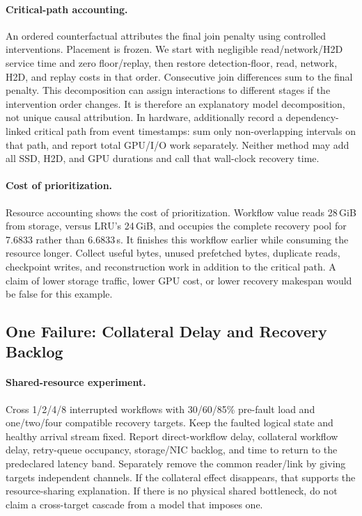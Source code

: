 \documentclass[sigplan,10pt,anonymous,nonacm]{acmart}
\begin{document}
\paragraph{Critical-path accounting.}
An ordered counterfactual attributes the final join penalty using controlled interventions. Placement is frozen. We start with negligible
read/network/H2D service time and zero floor/replay, then restore detection-floor, read, network, H2D, and replay costs in that order. Consecutive join differences sum to the final
penalty. This decomposition can assign interactions to different stages
if the intervention order changes. It is therefore an explanatory model
decomposition, not unique causal attribution. In hardware, additionally
record a dependency-linked critical path from event timestamps: sum only
non-overlapping intervals on that path, and report total GPU/I/O work
separately. Neither method may add all SSD, H2D, and GPU durations and
call that wall-clock recovery time.

\paragraph{Cost of prioritization.}
Resource accounting shows the cost of prioritization.
Workflow value reads 28\,GiB from storage, versus LRU's 24\,GiB, and
occupies the complete recovery pool for 7.6833 rather than 6.6833\,s.
It finishes this workflow earlier while consuming the resource longer.
Collect useful bytes, unused prefetched bytes, duplicate reads, checkpoint
writes, and reconstruction work in addition to the critical path. A claim
of lower storage traffic, lower GPU cost, or lower recovery makespan
would be false for this example.

\FloatBarrier
\subsection{One Failure: Collateral Delay and Recovery Backlog}

\paragraph{Shared-resource experiment.}
Cross 1/2/4/8 interrupted workflows with 30/60/85\% pre-fault load and
one/two/four compatible recovery targets. Keep the faulted logical state
and healthy arrival stream fixed. Report direct-workflow delay, collateral
workflow delay, retry-queue occupancy, storage/NIC backlog, and time to
return to the predeclared latency band. Separately remove the common
reader/link by giving targets independent channels. If the collateral
effect disappears, that supports the resource-sharing explanation.
If there is no physical shared bottleneck, do not claim a cross-target
cascade from a model that imposes one.
\end{document}
